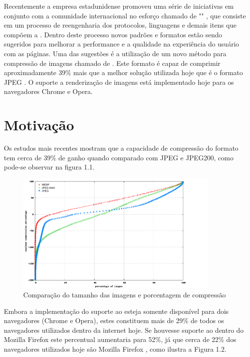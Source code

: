 \documentclass[espaco=simples,appendix=Name]{abnt}
\begin{document}
\begin{description}
Recentemente a empresa estadunidense  promoveu uma série de iniciativas em conjunto com a comunidade internacional no esforço chamado de "" \cite{WebFaster}, que consiste em um processo de reengenharia dos protocolos, linguagens e demais itens que compõem a . Dentro deste processo novos padrões e formatos estão sendo sugeridos para melhorar a performance e a qualidade na experiência do usuário com as páginas. Uma das sugestões é a utilização de um novo método para compressão de imagens chamado de . Este formato é capaz de comprimir aproximadamente 39\% mais que a melhor solução utilizada hoje que é o formato JPEG \cite{WebPStudy}. O suporte a renderização de imagens  está implementado hoje para os navegadores Chrome e Opera.

\section{Motivação}

\item \noindent Os estudos mais recentes mostram que a capacidade de compressão do formato  tem cerca de 39\% de ganho quando comparado com JPEG e JPEG200, como pode-se observar na figura 1.1.

\begin{figure}[h]
  \centering
    \includegraphics[width=0.9\textwidth]{Plot3_cdfcompr.png}
  \caption{Comparação do tamanho das imagens e porcentagem de compressão \protect\cite{WebPStudy}}
\end{figure}

Embora a implementação do suporte ao  esteja somente disponível para dois navegadores (Chrome e Opera), estes constituem mais de 29\% de todos os navegadores utilizados dentro da internet hoje. Se houvesse suporte ao  dentro do Mozilla Firefox este percentual aumentaria para 52\%, já que cerca de 22\% dos navegadores utilizados hoje são Mozilla Firefox \cite{BrowserStats}, como ilustra a Figura 1.2.


\end{description}
\end{document}

